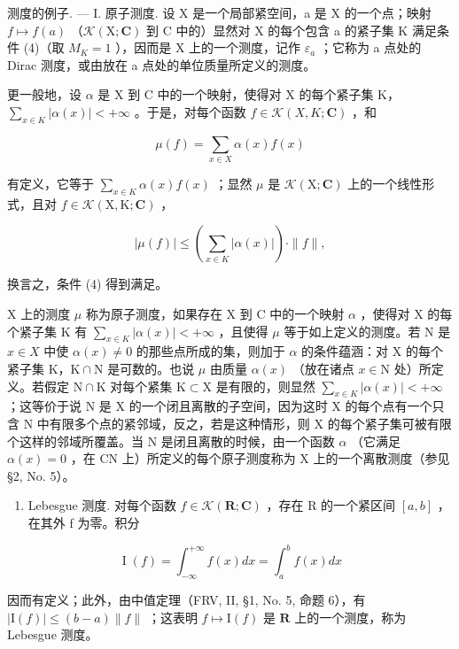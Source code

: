 测度的例子. --- I. 原子测度. 设 X 是一个局部紧空间，a 是 X 的一个点；映射 \(f \mapsto f(a)\) （\(\mathcal{K}(\mathrm{X};\mathbf{C})\) 到 C 中的）显然对 X 的每个包含 a 的紧子集 K 满足条件 (4)（取 \(M_{K} = 1\) ），因而是 X 上的一个测度，记作 \(\varepsilon_{a}\) ；它称为 a 点处的 Dirac 测度，或由放在 a 点处的单位质量所定义的测度。

更一般地，设 \(\alpha\) 是 X 到 C 中的一个映射，使得对 X 的每个紧子集 K，\(\sum_{x\in K}|\alpha(x)|<+\infty\) 。于是，对每个函数 \(f\in\mathcal{K}(X,K;\mathbf{C})\) ，和

\[
\mu (f) = \sum_ {x \in X} \alpha (x) f (x)
\]

有定义，它等于 \(\sum_{x\in K}\alpha (x)f(x)\) ；显然 \(\mu\) 是 \(\mathcal{K}(\mathrm{X};\mathbf{C})\) 上的一个线性形式，且对 \(f\in \mathcal{K}(\mathrm{X},\mathrm{K};\mathbf{C})\) ，

\[
| \mu (f) | \leqslant \left(\sum_ {x \in K} | \alpha (x) |\right) \cdot \| f \|,
\]

换言之，条件 (4) 得到满足。

X 上的测度 \(\mu\) 称为原子测度，如果存在 X 到 C 中的一个映射 \(\alpha\) ，使得对 X 的每个紧子集 K 有 \(\sum_{x\in K}|\alpha (x)| < +\infty\) ，且使得 \(\mu\) 等于如上定义的测度。若 N 是 \(x\in X\) 中使 \(\alpha (x)\neq 0\) 的那些点所成的集，则加于 \(\alpha\) 的条件蕴涵：对 X 的每个紧子集 K，\(\mathrm{K}\cap \mathrm{N}\) 是可数的。也说 \(\mu\) 由质量 \(\alpha (x)\) （放在诸点 \(x\in \mathrm{N}\) 处）所定义。若假定 \(\mathrm{N}\cap \mathrm{K}\) 对每个紧集 \(\mathrm{K}\subset \mathrm{X}\) 是有限的，则显然 \(\sum_{x\in K}|\alpha (x)| < +\infty\) ；这等价于说 N 是 X 的一个闭且离散的子空间，因为这时 X 的每个点有一个只含 N 中有限多个点的紧邻域，反之，若是这种情形，则 X 的每个紧子集可被有限个这样的邻域所覆盖。当 N 是闭且离散的时候，由一个函数 \(\alpha\) （它满足 \(\alpha(x)=0\) ，在 CN 上）所定义的每个原子测度称为 X 上的一个离散测度（参见 §2, No. 5）。

\begin{enumerate}
\def\labelenumi{\Roman{enumi}.}
\setcounter{enumi}{1}
\tightlist
\item
  Lebesgue 测度. 对每个函数 \(f \in \mathcal{K}(\mathbf{R}; \mathbf{C})\) ，存在 R 的一个紧区间 \([a, b]\) ，在其外 f 为零。积分
\end{enumerate}

\[
\operatorname{I} (f) = \int_ {- \infty} ^ {+ \infty} f (x) d x = \int_ {a} ^ {b} f (x) d x
\]

因而有定义；此外，由中值定理（FRV, II, §1, No. 5, 命题 6），有 \(|\mathrm{I}(f)| \leqslant (b - a) \| f \|\) ；这表明 \(f \mapsto \mathrm{I}(f)\) 是 \(\mathbf{R}\) 上的一个测度，称为 Lebesgue 测度。

